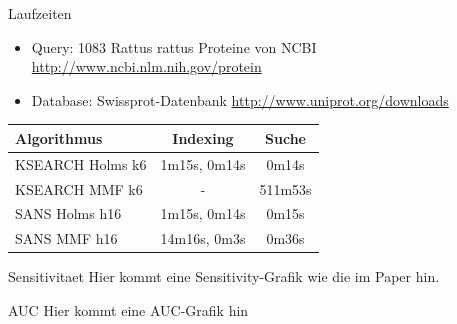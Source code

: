 \documentclass[xcolor=dvipsnames, aspectratio=1610]{beamer}
\begin{document}
\begin{frame}{Laufzeiten}
  \begin{itemize}
    \item Query: 1083 Rattus rattus Proteine von NCBI \tiny{\url{http://www.ncbi.nlm.nih.gov/protein}}
    \item \normalsize{Database: Swissprot-Datenbank} \tiny{\url{http://www.uniprot.org/downloads}}
  \end{itemize}
  \begin{tabular}{l|cc}
    Algorithmus & Indexing & Suche \\
    \hline
    KSEARCH Holms k6 & 1m15s, 0m14s  & 0m14s \\
    KSEARCH MMF k6 & -  & 511m53s \\
     SANS Holms h16 & 1m15s, 0m14s &  0m15s \\
       SANS MMF  h16 & 14m16s, 0m3s & 0m36s \\
  \end{tabular}
\end{frame}

\begin{frame}{Sensitivitaet}
  Hier kommt eine Sensitivity-Grafik wie die im Paper hin.
\end{frame}

\begin{frame}{AUC}
  Hier kommt eine AUC-Grafik hin
\end{frame}
\end{document}
